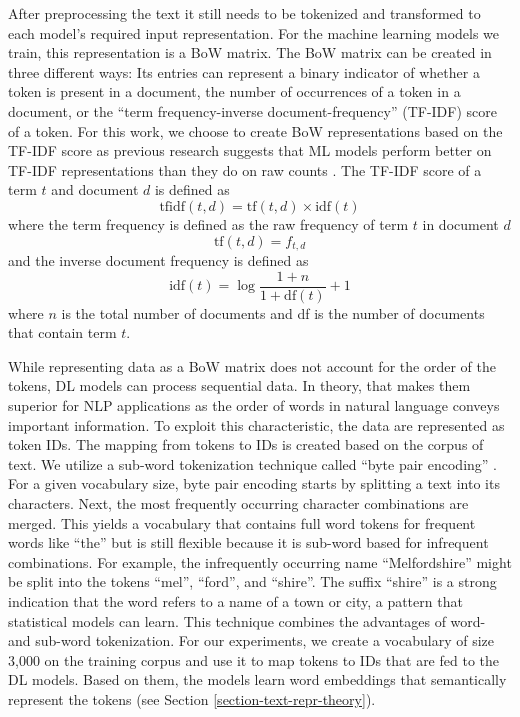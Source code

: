 After preprocessing the text it still needs to be tokenized and transformed to each model's required input representation. For the machine learning models we train, this representation is a BoW matrix. The BoW matrix can be created in three different ways: Its entries can represent a binary indicator of whether a token is present in a document, the number of occurrences of a token in a document, or the ``term frequency-inverse document-frequency'' (TF-IDF) score of a token. For this work, we choose to create BoW representations based on the TF-IDF score as previous research suggests that ML models perform better on TF-IDF representations than they do on raw counts .
The TF-IDF score of a term $t$ and document $d$ is defined as
\begin{equation}
	\textrm{tfidf}(t, d) = \textrm{tf}(t, d) \times \textrm{idf}(t)
\end{equation}
where the term frequency is defined as the raw frequency of term $t$ in document $d$
\begin{equation}
	 \textrm{tf}(t, d) = f_{t,d}
\end{equation}
and the inverse document frequency is defined as
\begin{equation}
	\textrm{idf}(t) = \log \frac{1+n}{1+\textrm{df}(t)} + 1
\end{equation}
where $n$ is the total number of documents and \textrm{df} is the number of documents that contain term $t$. 

While representing data as a BoW matrix does not account for the order of the tokens, DL models can process sequential data. In theory, that makes them superior for NLP applications as the order of words in natural language conveys important information. To exploit this characteristic, the data are represented as token IDs. The mapping from tokens to IDs is created based on the corpus of text. We utilize a sub-word tokenization technique called ``byte pair encoding'' . For a given vocabulary size, byte pair encoding starts by splitting a text into its characters. Next, the most frequently occurring character combinations are merged. This yields a vocabulary that contains full word tokens for frequent words like ``the'' but is still flexible because it is sub-word based for infrequent combinations. For example, the infrequently occurring name ``Melfordshire'' might be split into the tokens ``mel'', ``ford'', and ``shire''. The suffix ``shire'' is a strong indication that the word refers to a name of a town or city, a pattern that statistical models can learn. This technique combines the advantages of word- and sub-word tokenization. For our experiments, we create a vocabulary of size 3,000 on the training corpus and use it to map tokens to IDs that are fed to the DL models. Based on them, the models learn word embeddings that semantically represent the tokens (see Section \ref{section-text-repr-theory}).




